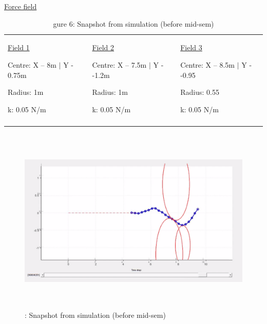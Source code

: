 \documentclass[12pt]{report}
\begin{document}


\vspace{\baselineskip}
\uline{Force field}\par





\begin{table}[H]
 			\centering
\begin{tabular}{p{1.89in}p{1.89in}p{1.89in}}
\hline
\multicolumn{1}{|p{1.89in}}{\uline{Field 1} \par Centre: X – 8m $ \vert $  Y - 0.75m \par Radius: 1m \par k: 0.05 N/m} & 
\multicolumn{1}{|p{1.89in}}{\uline{Field 2} \par Centre: X – 7.5m $ \vert $  Y - -1.2m \par Radius: 1m \par k: 0.05 N/m} & 
\multicolumn{1}{|p{1.89in}|}{\uline{Field 3} \par Centre: X – 8.5m $ \vert $  Y - -0.95 \par Radius: 0.55 \par k: 0.05 N/m} \\
\hhline{---}

\end{tabular}\caption{gure 6: Snapshot from simulation (before mid-sem)}
\label{tab:gure 6: Snapshot from simulation (before mid-sem)}

 \end{table}




\vspace{\baselineskip}



\begin{figure}[H]
	\begin{Center}
		\includegraphics[width=6.27in,height=3.53in]{./media/image7.png}
		\caption{: Snapshot from simulation (before mid-sem)}
		\label{fig:_Snapshot_from_simulation_before_midsem}
	\end{Center}
\end{figure}
\end{document}
